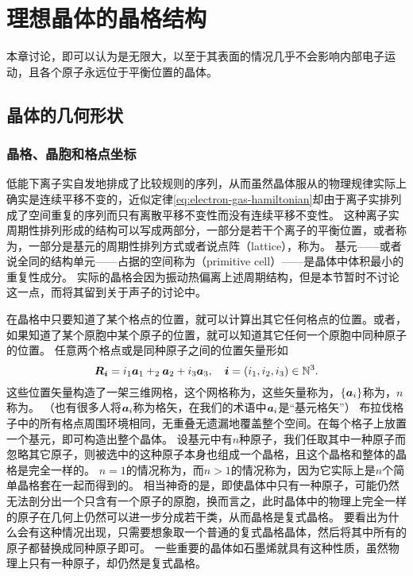 \chapter{理想晶体的晶格结构}\label{chap:lattice-structure}

本章讨论，即可以认为是无限大，以至于其表面的情况几乎不会影响内部电子运动，且各个原子永远位于平衡位置的晶体。

\section{晶体的几何形状}

\subsection{晶格、晶胞和格点坐标}

低能下离子实自发地排成了比较规则的序列，从而虽然晶体服从的物理规律实际上确实是连续平移不变的，近似定律\eqref{eq:electron-gas-hamiltonian}却由于离子实排列成了空间重复的序列而只有离散平移不变性而没有连续平移不变性。
这种离子实周期性排列形成的结构可以写成两部分，一部分是若干个离子的平衡位置，或者称为，一部分是基元的周期性排列方式或者说点阵（lattice），称为。
基元——或者说全同的结构单元——占据的空间称为（primitive cell）——是晶体中体积最小的重复性成分。
实际的晶格会因为振动热偏离上述周期结构，但是本节暂时不讨论这一点，而将其留到关于声子的讨论中。

在晶格中只要知道了某个格点的位置，就可以计算出其它任何格点的位置。或者，如果知道了某个原胞中某个原子的位置，就可以知道其它任何一个原胞中同种原子的位置。
任意两个格点或是同种原子之间的位置矢量形如
\begin{equation}
    \vb*{R}_{\vb*{i}} = i_1 \vb*{a}_1 + _2 \vb*{a}_2 + i_3 \vb*{a}_3, \quad \vb*{i} = (i_1, i_2, i_3) \in \mathbb{N}^3.
\end{equation}
这些位置矢量构造了一架三维网格，这个网格称为，这些矢量称为，$\{\vb*{a}_i\}$称为，$n$称为。
（也有很多人将$\vb*{a}_i$称为格矢，在我们的术语中$\vb*{a}_i$是“基元格矢”）
布拉伐格子中的所有格点周围环境相同，无重叠无遗漏地覆盖整个空间。在每个格子上放置一个基元，即可构造出整个晶体。
设基元中有$n$种原子，我们任取其中一种原子而忽略其它原子，则被选中的这种原子本身也组成一个晶格，且这个晶格和整体的晶格是完全一样的。
$n=1$的情况称为，而$n>1$的情况称为，因为它实际上是$n$个简单晶格套在一起而得到的。
相当神奇的是，即使晶体中只有一种原子，可能仍然无法剖分出一个只含有一个原子的原胞，换而言之，此时晶体中的物理上完全一样的原子在几何上仍然可以进一步分成若干类，从而晶格是复式晶格。
要看出为什么会有这种情况出现，只需要想象取一个普通的复式晶格晶体，然后将其中所有的原子都替换成同种原子即可。
一些重要的晶体如石墨烯就具有这种性质，虽然物理上只有一种原子，却仍然是复式晶格。

